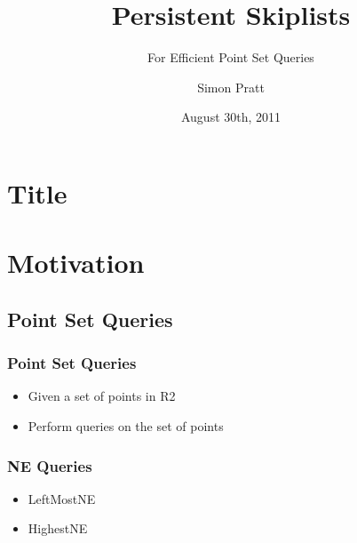 \documentclass{beamer}
\title{Persistent Skiplists}
\subtitle{For Efficient Point Set Queries}
\author{Simon Pratt}
\institute[Carleton University]
{
  Carleton University
}
\date{August 30th, 2011}
\begin{document}
\section{Title}
\begin{frame}
  \titlepage
\end{frame}




\section{Motivation}

\subsection{Point Set Queries}

\begin{frame}
  \frametitle{Point Set Queries}

  \begin{itemize}
  \item
    Given a set of points in R2
  \item
    Perform queries on the set of points
  \end{itemize}
\end{frame}

\begin{frame}
  \frametitle{NE Queries}

  \begin{itemize}
  \item
    LeftMostNE
  \item
    HighestNE
  \end{itemize}
\end{frame}
\end{document}
